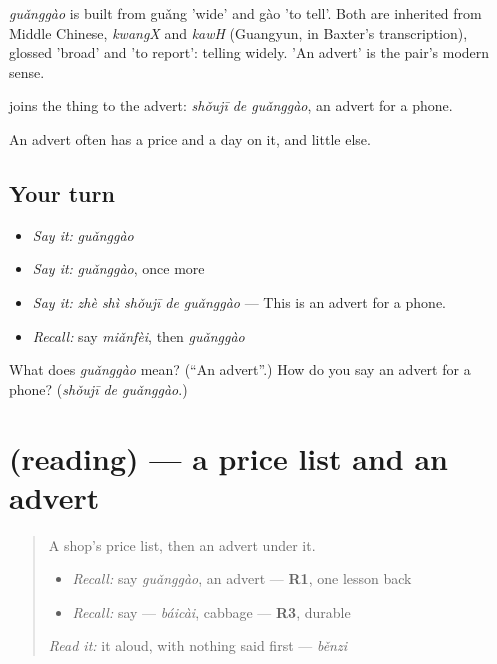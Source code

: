 \begin{cousinweb}
\emph{guǎnggào} is built from guǎng 'wide' and gào 'to tell'. Both are inherited from Middle Chinese, \emph{kwangX} and \emph{kawH} (Guangyun, in Baxter's transcription), glossed 'broad' and 'to report': telling widely. 'An advert' is the pair's modern sense.
\end{cousinweb}

\begin{grammarlens}[title={What you've built}]
 joins the thing to the advert: \emph{shǒujī de guǎnggào}, an advert for a phone.

An advert often has a price and a day on it, and little else.
\end{grammarlens}

\subsection*{Your turn}
\begin{itemize}
\raggedright
  \item \emph{Say it:} \emph{guǎnggào}
  \item \emph{Say it:} \emph{guǎnggào}, once more
  \item \emph{Say it:} \emph{zhè shì shǒujī de guǎnggào} — This is an advert for a phone.
  \item \emph{Recall:} say \emph{miǎnfèi}, then \emph{guǎnggào}
\end{itemize}

\begin{tcolorbox}[breakable,colback=teal!4,colframe=teal!35!black,title={Before you move on}]
What does \emph{guǎnggào} mean? (\textquotedblleft{}An advert\textquotedblright{}.) How do you say an advert for a phone? (\emph{shǒujī de guǎnggào}.)
\end{tcolorbox}
\section[(reading)]{(reading) — a price list and an advert}

\label{lesson:ZH-C156-reading}



\begin{quote}
A shop's price list, then an advert under it.

\begin{itemize}
\raggedright
  \item \emph{Recall:} say \emph{guǎnggào}, an advert — \textbf{R1}, one lesson back
  \item \emph{Recall:} say  — \emph{báicài}, cabbage — \textbf{R3}, durable
\end{itemize}

\begin{quote}
\end{quote}

\emph{Read it:} it aloud, with nothing said first — \emph{běnzi}
\end{quote}

